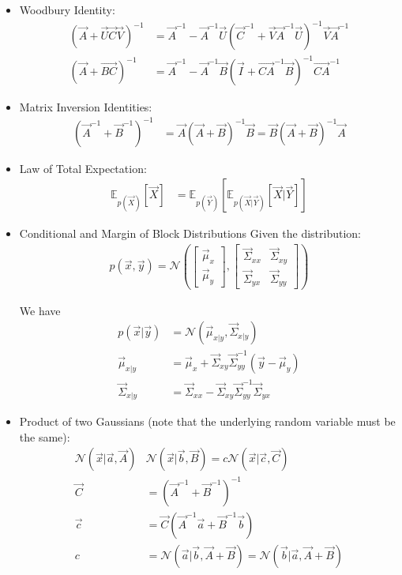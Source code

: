 \documentclass[12pt,twoside]{article}
\begin{document}
\begin{itemize}
\item Woodbury Identity:
	\begin{align*}
		(\vec{A} + \vec{U}\vec{C}\vec{V})^{-1} &= \vec{A}^{-1}-\vec{A}^{-1} \vec{U}(\vec{C}^{-1}+\vec{V}\vec{A}^{-1}\vec{U})^{-1}\vec{V}\vec{A}^{-1}\\
			(\vec{A} + \vec{BC})^{-1}& = \vec{A}^{-1} - \vec{A}^{-1}\vec{B} (\vec{I} + \vec{CA}^{-1}\vec{B})^{-1}\vec{CA}^{-1} 
	\end{align*}

\item Matrix Inversion Identities:
	\begin{align*}
		(\vec{A}^{-1} + \vec{B}^{-1})^{-1} &= \vec{A}(\vec{A}+\vec{B})^{-1}\vec{B} =  \vec{B}(\vec{A}+\vec{B})^{-1}\vec{A}
	\end{align*}

\item Law of Total Expectation:
	\begin{align*}
		\mathbb{E}_{p(\vec{X})}[\vec{X}] & =\mathbb{E}_{p(\vec{Y})}[\mathbb{E}_{p(\vec{X}\vert\vec{Y})}[\vec{X}\vert \vec{Y}]] 
	\end{align*}


\item Conditional and Margin of Block Distributions
Given the distribution:
\begin{align*}
	p(\vec{x},\vec{y}) = \mathcal{N}\left(
	\begin{bmatrix}
	\vec{\mu}_x\\
	\vec{\mu}_y
	\end{bmatrix},
	\begin{bmatrix}
	\vec{\Sigma}_{xx}	& \vec{\Sigma}_{xy}\\
	\vec{\Sigma}_{yx}	& \vec{\Sigma}_{yy}
	\end{bmatrix}
	\right)
\end{align*}

We have
\begin{align*}
	p(\vec{x}\vert \vec{y})
	& = \mathcal{N}\left(\vec{\mu}_{x\vert y}, \vec{\Sigma}_{x\vert y}\right)\\
	\vec{\mu}_{x\vert y}
	&=\vec{\mu}_x+ \vec{\Sigma}_{xy}\vec{\Sigma}_{yy}^{-1}(\vec {y} - \vec{\mu}_y)\\
	\vec{\Sigma}_{x\vert y}
	&=\vec{\Sigma}_{xx} - \vec{\Sigma}_{xy}\vec{\Sigma}_{yy}^{-1}\vec{\Sigma}_{yx}
\end{align*}

\item Product of two Gaussians (note that the underlying random variable must be the same):
	\begin{align*}
		\mathcal{N}(\vec{x}\vert \vec{a}, \vec{A})&\mathcal{N}(\vec{x}\vert \vec{b}, \vec{B})= c\mathcal{N}(\vec{x}\vert \vec{c}, \vec{C})\\
		\vec{C} &= (\vec{A}^{-1}+\vec{B}^{-1})^{-1}\\
		\vec{c} &= \vec{C}(\vec{A}^{-1}\vec{a}+\vec{B}^{-1}\vec{b})\\
		c& = \mathcal{N}(\vec{a}\vert \vec{b}, \vec{A} + \vec{B}) = \mathcal{N}(\vec{b}\vert \vec{a}, \vec{A} + \vec{B})
	\end{align*}


\end{itemize}
\end{document}
